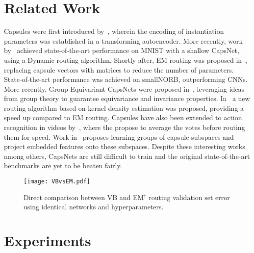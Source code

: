 \documentclass[letterpaper]{article} \usepackage{aaai20}  \usepackage{times}  \usepackage{helvet} \usepackage{courier}  \usepackage[hyphens]{url}  \usepackage{graphicx} \urlstyle{rm} \def\UrlFont{\rm}  \usepackage{graphicx}  \frenchspacing  \setlength{\pdfpagewidth}{8.5in}  \setlength{\pdfpageheight}{11in}  \nocopyright
\begin{document}
\section{Related Work}
Capsules were first introduced by~\cite{hinton2011transforming}, wherein the encoding of instantiation parameters was established in a transforming autoencoder. More recently, work by~\cite{sabour2017dynamic} achieved state-of-the-art performance on MNIST with a shallow CapsNet, using a Dynamic routing algorithm. Shortly after, EM routing was proposed in~\cite{hinton2018matrix}, replacing capsule vectors with matrices to reduce the number of parameters. State-of-the-art performance was achieved on smallNORB, outperforming CNNs. More recently, Group Equivariant CapsNets were proposed in~\cite{lenssen2018group}, leveraging ideas from group theory to guarantee equivariance and invariance properties. In~\cite{zhang2018fast} a new routing algorithm based on kernel density estimation was proposed, providing a speed up compared to EM routing. Capsules have also been extended to action recognition in videos by~\cite{duarte2018videocapsulenet}, where the propose to average the votes before routing them for speed. Work in~\cite{zhang2018cappronet} proposes learning groups of capsule subspaces and project embedded features onto these subspaces. Despite these interesting works among others, CapsNets are still difficult to train and the original state-of-the-art benchmarks are yet to be beaten fairly.
\begin{figure*}[t]
    \centering
    \texttt{[image: VBvsEM.pdf]}
 \caption{Direct comparison between VB and EM$^{\dagger}$ routing validation set error using identical networks and hyperparameters.} 
\label{loss_curves}
\end{figure*}
\section{Experiments}
\end{document}
